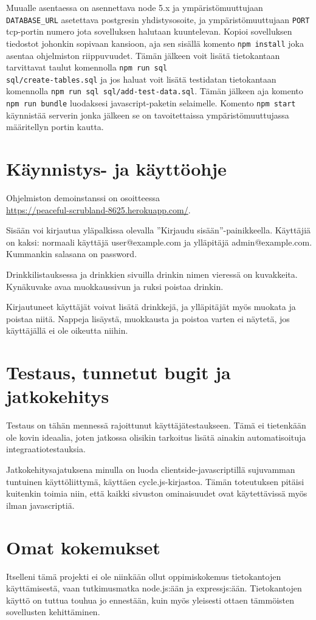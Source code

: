 \documentclass[a4paper]{article}
\begin{document}
Muualle asentaessa on asennettava node 5.x ja ympäristömuuttujaan \texttt{DATABASE\_URL} asetettava postgresin yhdistysosoite, ja ympäristömuuttujaan \texttt{PORT} tcp-portin numero jota sovelluksen halutaan kuuntelevan. Kopioi sovelluksen tiedostot johonkin sopivaan kansioon, aja sen sisällä komento \texttt{npm install} joka asentaa ohjelmiston riippuvuudet. Tämän jälkeen voit lisätä tietokantaan tarvittavat taulut komennolla \texttt{npm run sql \\ sql/create-tables.sql} ja jos haluat voit lisätä testidatan tietokantaan komennolla \texttt{npm run sql sql/add-test-data.sql}. Tämän jälkeen aja komento \texttt{npm run bundle} luodaksesi javascript-paketin selaimelle. Komento \texttt{npm start} käynnistää serverin jonka jälkeen se on tavoitettaissa ympäristömuuttujassa määritellyn portin kautta.

\section{Käynnistys- ja käyttöohje}
Ohjelmiston demoinstanssi on osoitteessa \\ \url{https://peaceful-scrubland-8625.herokuapp.com/}.

Sisään voi kirjautua yläpalkissa olevalla ''Kirjaudu sisään''-painikkeella. Käyttäjiä on kaksi: normaali käyttäjä user@example.com ja ylläpitäjä admin@example.com. Kummankin salasana on password.

Drinkkilistauksessa ja drinkkien sivuilla drinkin nimen vieressä on kuvakkeita. Kynäkuvake avaa muokkaussivun ja ruksi poistaa drinkin.

Kirjautuneet käyttäjät voivat lisätä drinkkejä, ja ylläpitäjät myös muokata ja poistaa niitä. Nappeja lisäystä, muokkausta ja poistoa varten ei näytetä, jos käyttäjällä ei ole oikeutta niihin.

\section{Testaus, tunnetut bugit ja jatkokehitys}
Testaus on tähän mennessä rajoittunut käyttäjätestaukseen. Tämä ei tietenkään ole kovin ideaalia, joten jatkossa olisikin tarkoitus lisätä ainakin automatisoituja integraatiotestauksia.

Jatkokehitysajatuksena minulla on luoda clientside-javascriptillä sujuvamman tuntuinen käyttöliittymä, käyttäen cycle.js-kirjastoa. Tämän toteutuksen pitäisi kuitenkin toimia niin, että kaikki sivuston ominaisuudet ovat käytettävissä myös ilman javascriptiä.

\section{Omat kokemukset}
Itselleni tämä projekti ei ole niinkään ollut oppimiskokemus tietokantojen käyttämisestä, vaan tutkimusmatka node.js:ään ja expressjs:ään. Tietokantojen käyttö on tuttua touhua jo ennestään, kuin myös yleisesti ottaen tämmöisten sovellusten kehittäminen.
\end{document}
